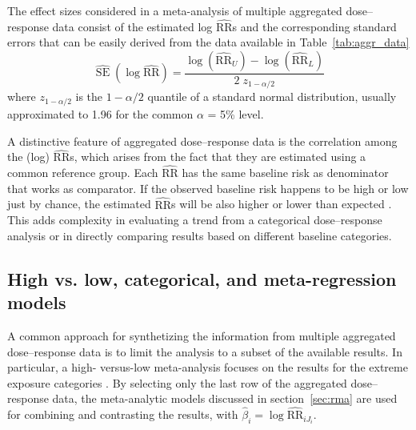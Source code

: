 \documentclass[11pt,a4paper,twoside,openany]{book}\usepackage{knitr}
\DeclareMathOperator{\SE}{SE}
\begin{document}
{{%
The effect sizes considered in a meta-analysis of multiple aggregated dose--response data consist of the estimated log $\widehat{\mathrm{RR}}$s and the corresponding standard errors that can be easily derived from the data available in Table~\ref{tab:aggr_data}
\begin{equation}
\widehat{\SE} \left( \log \widehat{\mathrm{RR}} \right) = \frac{\log \left(\widehat{\mathrm{RR}}_U \right) - \log \left(\widehat{\mathrm{RR}}_L \right)}{2\; z_{1- \alpha/2}}
\label{eq:se_logrr}
\end{equation} 
\noindent where $z_{1- \alpha/2}$ is the $1- \alpha/2$ quantile of a standard normal distribution, usually approximated to 1.96 for the common $\alpha$ = 5\% level.

A distinctive feature of aggregated dose--response data is the correlation among the (log) $\widehat{\mathrm{RR}}$s, which arises from the fact that they are estimated using a common reference group. Each $\widehat{\mathrm{RR}}$ has the same baseline risk as denominator that works as comparator. If the observed baseline risk happens to be high or low just by chance, the estimated $\widehat{\mathrm{RR}}$s will be also higher or lower than expected \citep{schmid1998empirical}. This adds complexity in evaluating a trend from a categorical dose--response analysis or in directly comparing results based on different baseline categories. 

\subsection{High vs. low, categorical, and meta-regression models}

A common approach for synthetizing the information from multiple aggregated dose--response data is to limit the analysis to a subset of the available results. In particular, a high- versus-low meta-analysis focuses on the results for the extreme exposure categories \citep{yu2013empirical}. By selecting only the last row of the aggregated dose--response data, the meta-analytic models discussed in section~\ref{sec:rma} are used for combining and contrasting the results, with $\hat \beta_i = \log \widehat{\mathrm{RR}}_{iJ_i}$. 

}}
\end{document}
